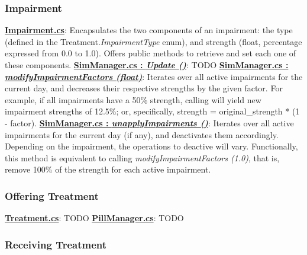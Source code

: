 \documentclass{article}
\begin{document}
\subsubsection*{Impairment} %
\href{https://bit.ly/2JFJ9mj}{\textbf{Impairment.cs}}: Encapsulates the two components of an impairment: the type (defined in the Treatment.\textit{ImpairmentType} enum), and strength (float, percentage expressed from 0.0 to 1.0). Offers public methods to retrieve and set each one of these components. \newline \newline
\href{https://bit.ly/2UhmSzq}{\textbf{SimManager.cs : \textit{Update ()}}}: TODO \newline \newline %
\href{https://bit.ly/2UhmSzq}{\textbf{SimManager.cs : \textit{modifyImpairmentFactors (float)}}}: Iterates over all active impairments for the current day, and decreases their respective strengths by the given factor. For example, if all impairments have a 50\% strength, calling  will yield new impairment strengths of 12.5\%; or, specifically, strength = original\_strength * (1 - factor).  \newline \newline
\href{https://bit.ly/2UhmSzq}{\textbf{SimManager.cs : \textit{unapplyImpairments ()}}}: Iterates over all active impairments for the current day (if any), and deactivates them accordingly. Depending on the impairment, the operations to deactive will vary. Functionally, this method is equivalent to calling \textit{modifyImpairmentFactors (1.0)}, that is, remove 100\% of the strength for each active impairment. 

\subsubsection*{Offering Treatment} %
\href{https://bit.ly/2TwrvAZ}{\textbf{Treatment.cs}}: TODO \newline \newline
\href{https://bit.ly/2JDPChz}{\textbf{PillManager.cs}}: TODO 

\subsubsection*{Receiving Treatment} %
\end{document}
